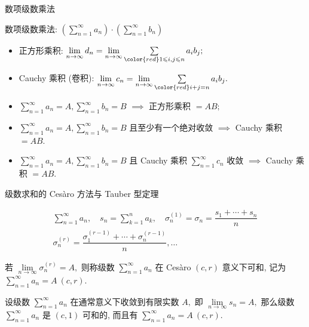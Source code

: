 \begin{frame}{数项级数乘法}

数项级数乘法: $\left( \sum\limits_{n=1}^\infty a_n \right) \cdot \left( \sum\limits_{n=1}^\infty b_n \right)$

\pause

\begin{itemize}
\item 正方形乘积: $\lim\limits_{n\to\infty} d_n = \lim\limits_{n\to\infty} \sum\limits_{\color{red} 1 \leqslant i, j \leqslant n} a_i b_j;$
\pause
\item Cauchy 乘积 (卷积): $\lim\limits_{n\to\infty} c_n = \lim\limits_{n\to\infty} \sum\limits_{\color{red} i+j=n} a_i b_j.$
\end{itemize}

\pause

\begin{prop}[乘积收敛性]
\begin{itemize}[<+->]
\item $\sum\limits_{n=1}^\infty a_n = A, \sum\limits_{n=1}^\infty b_n = B$ $\implies$ 正方形乘积 $= AB;$
\item $\sum\limits_{n=1}^\infty a_n = A, \sum\limits_{n=1}^\infty b_n = B$ 且至少有一个绝对收敛 $\implies$ Cauchy 乘积 $= AB.$
\item $\sum\limits_{n=1}^\infty a_n = A, \sum\limits_{n=1}^\infty b_n = B$ 且 Cauchy 乘积 $\sum\limits_{n=1}^\infty c_n$ 收敛 $\implies$ Cauchy 乘积 $= AB.$
\end{itemize}
\end{prop}

\end{frame}


\begin{frame}{级数求和的 Cesàro 方法与 Tauber 型定理}

\vspace{-2em}

\begin{gather*}
\sum\limits_{n=1}^\infty a_n, \quad s_n = \sum\limits_{k=1}^n a_k, \quad \sigma_n^{(1)} = \sigma_n = \dfrac{s_1 + \cdots + s_n}{n}\\
\sigma_n^{(r)} = \dfrac{\sigma_1^{(r-1)} + \cdots + \sigma_n^{(r-1)}}{n}, \dots
\end{gather*}

\pause

\begin{Def}
若 $\lim\limits_{n\to\infty} \sigma_n^{(r)} = A,$ 则称级数 $\sum\limits_{n=1}^\infty a_n$ 在 Cesàro $(c,r)$ 意义下可和, 记为 $\sum\limits_{n=1}^\infty a_n = A ~ (c,r).$
\end{Def}

\pause

\begin{prop}
设级数 $\sum\limits_{n=1}^{\infty} a_n$ 在通常意义下收敛到有限实数 $A,$ 即 $\lim\limits_{n \to \infty} s_n = A,$ 那么级数 $\sum\limits_{n=1}^{\infty} a_n$ 是 $(c, 1)$ 可和的, 而且有 $\sum\limits_{n=1}^{\infty} a_n = A ~ (c,r).$
\end{prop}

\end{frame}

